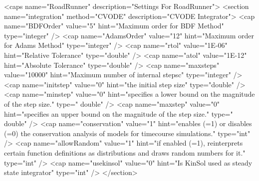 \begin{DoxyCode}
 <caps name=\textcolor{stringliteral}{"RoadRunner"} description=\textcolor{stringliteral}{"Settings For RoadRunner"}>
  <section name=\textcolor{stringliteral}{"integration"} method=\textcolor{stringliteral}{"CVODE"} description=\textcolor{stringliteral}{"CVODE Integrator"}>
    <cap name=\textcolor{stringliteral}{"BDFOrder"} value=\textcolor{stringliteral}{"5"} hint=\textcolor{stringliteral}{"Maximum order for BDF Method"} type=\textcolor{stringliteral}{"integer"} />
    <cap name=\textcolor{stringliteral}{"AdamsOrder"} value=\textcolor{stringliteral}{"12"} hint=\textcolor{stringliteral}{"Maximum order for Adams Method"} type=\textcolor{stringliteral}{"integer"} />
    <cap name=\textcolor{stringliteral}{"rtol"} value=\textcolor{stringliteral}{"1E-06"} hint=\textcolor{stringliteral}{"Relative Tolerance"} type=\textcolor{stringliteral}{"double"} />
    <cap name=\textcolor{stringliteral}{"atol"} value=\textcolor{stringliteral}{"1E-12"} hint=\textcolor{stringliteral}{"Absolute Tolerance"} type=\textcolor{stringliteral}{"double"} />
    <cap name=\textcolor{stringliteral}{"maxsteps"} value=\textcolor{stringliteral}{"10000"} hint=\textcolor{stringliteral}{"Maximum number of internal stepsc"} type=\textcolor{stringliteral}{"integer"} />
    <cap name=\textcolor{stringliteral}{"initstep"} value=\textcolor{stringliteral}{"0"} hint=\textcolor{stringliteral}{"the initial step size"} type=\textcolor{stringliteral}{"double"} />
    <cap name=\textcolor{stringliteral}{"minstep"} value=\textcolor{stringliteral}{"0"} hint=\textcolor{stringliteral}{"specifies a lower bound on the magnitude of the step size."} type=\textcolor{stringliteral}{"
      double"} />
    <cap name=\textcolor{stringliteral}{"maxstep"} value=\textcolor{stringliteral}{"0"} hint=\textcolor{stringliteral}{"specifies an upper bound on the magnitude of the step size."} type=\textcolor{stringliteral}{"
      double"} />
    <cap name=\textcolor{stringliteral}{"conservation"} value=\textcolor{stringliteral}{"1"} hint=\textcolor{stringliteral}{"enables (=1) or disables (=0) the conservation analysis of
       models for timecourse simulations."} type=\textcolor{stringliteral}{"int"} />
    <cap name=\textcolor{stringliteral}{"allowRandom"} value=\textcolor{stringliteral}{"1"} hint=\textcolor{stringliteral}{"if enabled (=1), reinterprets certain function definitions as
       distributions and draws random numbers for it."} type=\textcolor{stringliteral}{"int"} />
    <cap name=\textcolor{stringliteral}{"usekinsol"} value=\textcolor{stringliteral}{"0"} hint=\textcolor{stringliteral}{"Is KinSol used as steady state integrator"} type=\textcolor{stringliteral}{"int"} />
  </section>


\end{DoxyCode}
